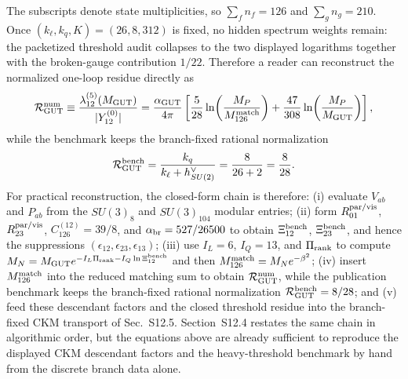 \documentclass[11pt]{article}
\begin{document}
The subscripts denote state multiplicities, so $\sum_f n_f=126$ and
$\sum_g n_g=210$. Once $(k_{\ell},k_q,K)=(26,8,312)$ is fixed, no hidden
spectrum weights remain: the packetized threshold audit collapses to the two
displayed logarithms together with the broken-gauge contribution $1/22$.
Therefore a reader can reconstruct the normalized one-loop residue directly as
\begin{equation}
 \mathcal R_{\rm GUT}^{\rm num}
 \equiv
 \frac{\lambda_{12}^{(5)}(M_{\rm GUT})}{|Y_{12}^{(0)}|}
 =
 \frac{\alpha_{\rm GUT}}{4\pi}
 \left[
  \frac{5}{28}\ln\!\left(\frac{M_P}{M_{126}^{\rm match}}\right)
  +
  \frac{47}{308}\ln\!\left(\frac{M_P}{M_{\rm GUT}}\right)
 \right],
\end{equation}
while the benchmark keeps the branch-fixed rational normalization
\begin{equation}
 \mathcal R_{\rm GUT}^{\rm bench}
 =
 \frac{k_q}{k_{\ell}+h_{SU(2)}^{\vee}}
 =
 \frac{8}{26+2}
 =
 \frac{8}{28}.
\end{equation}
For practical reconstruction, the closed-form chain is therefore: (i) evaluate
$V_{ab}$ and $P_{ab}$ from the $SU(3)_8$ and $SU(3)_{104}$ modular entries;
(ii) form $R_{01}^{\rm par/vis}$, $R_{23}^{\rm par/vis}$,
$C_{126}^{(12)}=39/8$, and $\alpha_{\rm br}=527/26500$ to obtain
$\Xi_{12}^{\rm bench}$, $\Xi_{23}^{\rm bench}$, and hence the suppressions
$(\epsilon_{12},\epsilon_{23},\epsilon_{13})$; (iii) use $I_L=6$, $I_Q=13$,
and $\Pi_{\rm rank}$ to compute
$M_N=M_{\rm GUT}e^{-I_L\Pi_{\rm rank}-I_Q\ln\Xi_{12}^{\rm bench}}$ and then
$M_{126}^{\rm match}=M_Ne^{-\beta^2}$; (iv) insert $M_{126}^{\rm match}$ into
the reduced matching sum to obtain $\mathcal R_{\rm GUT}^{\rm num}$, while the
publication benchmark keeps the branch-fixed rational normalization
$\mathcal R_{\rm GUT}^{\rm bench}=8/28$; and (v) feed these descendant factors
and the closed threshold residue into the branch-fixed CKM transport of
Sec.~S12.5. Section~S12.4 restates the same chain in algorithmic order, but the
equations above are already sufficient to reproduce the displayed CKM
descendant factors and the heavy-threshold benchmark by hand from the discrete
branch data alone.
\end{document}
